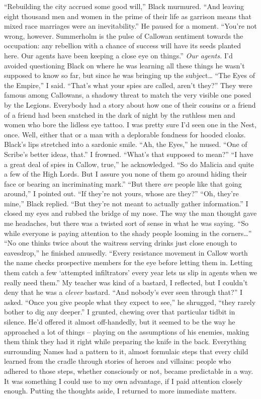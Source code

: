 \documentclass[12pt, openany]{book}
\begin{document}
“Rebuilding the city accrued some good will,” Black murmured. “And leaving eight thousand men and women in the prime of their life as garrison means that mixed race marriages were an inevitability.”
He paused for a moment.
“You’re not wrong, however. Summerholm is the pulse of Callowan sentiment towards the occupation: any rebellion with a chance of success will have its seeds planted here. Our agents have been keeping a close eye on things.”
\textit{Our agents.} I’d avoided questioning Black on where he was learning all these things he wasn’t supposed to know so far, but since he was bringing up the subject…
“The Eyes of the Empire,” I said. “That’s what your spies are called, aren’t they?”
They were famous among Callowans, a shadowy threat to match the very visible one posed by the Legions. Everybody had a story about how one of their cousins or a friend of a friend had been snatched in the dark of night by the ruthless men and women who bore the lidless eye tattoo. I was pretty sure I’d seen one in the Nest, once. Well, either that or a man with a deplorable fondness for hooded cloaks. Black’s lips stretched into a sardonic smile.
“Ah, the Eyes,” he mused. “One of Scribe’s better ideas, that.”
I frowned. “What’s that supposed to mean?”
“I have a great deal of spies in Callow, true,” he acknowledged. “So do Malicia and quite a few of the High Lords. But I assure you none of them go around hiding their face or bearing an incriminating mark.”
“But there \textit{are }people like that going around,” I pointed out. “If they’re not yours, whose are they?”
“Oh, they’re mine,” Black replied. “But they’re not meant to actually gather information.”
I closed my eyes and rubbed the bridge of my nose. The way the man thought gave me headaches, but there was a twisted sort of sense in what he was saying.
“So while everyone is paying attention to the shady people looming in the corners…”
“No one thinks twice about the waitress serving drinks just close enough to eavesdrop,” he finished amusedly. “Every resistance movement in Callow worth the name checks prospective members for the eye before letting them in. Letting them catch a few ‘attempted infiltrators’ every year lets us slip in agents when we really need them.”
My teacher was kind of a bastard, I reflected, but I couldn’t deny that he was a \textit{clever} bastard.
“And nobody’s ever seen through that?” I asked.
“Once you give people what they expect to see,” he shrugged, “they rarely bother to dig any deeper.”
I grunted, chewing over that particular tidbit in silence. He’d offered it almost off-handedly, but it seemed to be the way he approached a lot of things – playing on the assumptions of his enemies, making them think they had it right while preparing the knife in the back. Everything surrounding Names had a pattern to it, almost formulaic steps that every child learned from the cradle through stories of heroes and villains: people who adhered to those steps, whether consciously or not, became predictable in a way. It was something I could use to my own advantage, if I paid attention closely enough. Putting the thoughts aside, I returned to more immediate matters.
\end{document}
